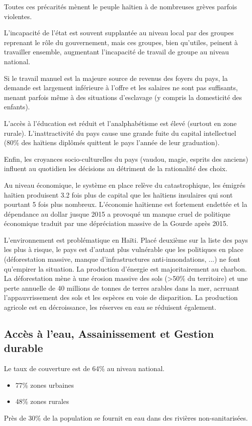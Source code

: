 \documentclass[a4paper, 11pt]{article}
\begin{document}
  Toutes ces précarités mènent le peuple haïtien à de nombreuses grèves parfois violentes.

  L'incapacité de l'état est souvent supplantée au niveau local par des groupes reprenant le rôle du gouvernement, mais ces groupes, bien qu'utiles, peinent à travailler ensemble, augmentant l'incapacité de travail de groupe au niveau national.

  Si le travail manuel est la majeure source de revenus des foyers du pays, la demande est largement inférieure à l'offre et les salaires ne sont pas suffisants, menant parfois même à des situations d'esclavage (y compris la domesticité des enfants).

  L'accès à l'éducation est réduit et l'analphabétisme est élevé (surtout en zone rurale). L'inattractivité du pays cause une grande fuite du capital intellectuel (80\% des haïtiens diplômés quittent le pays l'année de leur graduation).

  Enfin, les croyances socio-culturelles du pays (vaudou, magie, esprits des anciens) influent au quotidien les décisions au détriment de la rationalité des choix.

  Au niveau économique, le système en place relève du catastrophique, les émigrés haïtien produisent 3.2 fois plus de capital que les haïtiens insulaires qui sont pourtant 5 fois plus nombreux. L'économie haïtienne est fortement endettée et la dépendance au dollar jusque 2015 a provoqué un manque cruel de politique économique traduit par une dépréciation massive de la Gourde après 2015.

  L'environnement est problématique en Haïti. Placé deuxième sur la liste des pays les plus à risque, le pays est d'autant plus vulnérable que les politiques en place (déforestation massive, manque d'infrastructures anti-innondations, ...) ne font qu'empirer la situation. La production d'énergie est majoritairement au charbon.
  La déforestation mène à une érosion massive des sols (>50\% du territoire) et une perte annuelle de 40 millions de tonnes de terres arables dans la mer, acrruant l'appauvrissement des sols et les espèces en voie de disparition. La production agricole est en décroissance, les réserves en eau se réduisent également.

  \subsection*{Accès à l'eau, Assainissement et Gestion durable}
  Le taux de couverture est de 64\% au niveau national.
  \begin{itemize}
    \item 77\% zones urbaines
    \item 48\% zones rurales
  \end{itemize}
  Près de 30\% de la population se fournit en eau dans des rivières non-sanitarisées.
\end{document}
